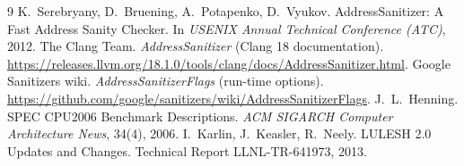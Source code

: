 \documentclass[10pt,a4paper]{article}
\begin{document}
\begin{thebibliography}{9}\small
{} K.~Serebryany, D.~Bruening, A.~Potapenko, D.~Vyukov.
\newblock AddressSanitizer: A Fast Address Sanity Checker.
\newblock In \emph{USENIX Annual Technical Conference (ATC)}, 2012.
 The Clang Team. \emph{AddressSanitizer} (Clang 18 documentation).
\newblock \url{https://releases.llvm.org/18.1.0/tools/clang/docs/AddressSanitizer.html}.
 Google Sanitizers wiki. \emph{AddressSanitizerFlags} (run-time options).
\newblock \url{https://github.com/google/sanitizers/wiki/AddressSanitizerFlags}.
 J.~L.~Henning. SPEC CPU2006 Benchmark Descriptions.
\newblock \emph{ACM SIGARCH Computer Architecture News}, 34(4), 2006.
 I.~Karlin, J.~Keasler, R.~Neely. LULESH 2.0 Updates and Changes.
\newblock Technical Report LLNL-TR-641973, 2013.
\end{thebibliography}
\end{document}
